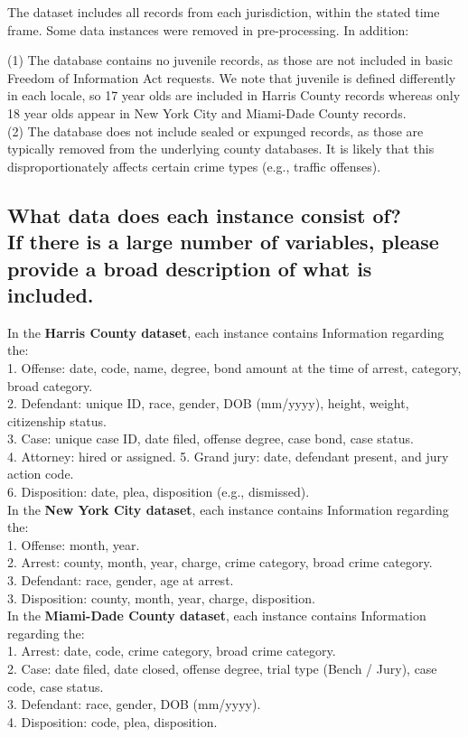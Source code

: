 \documentclass[letterpaper, 10 pt, conference]{ieeeconf}  %
\newcommand{\subtitle}[1]{{\\ \small \normalfont \color{purple} #1}}
\begin{document}
The dataset includes all records from each jurisdiction, within the stated time frame. Some data instances were removed in pre-processing. In addition: 

(1) The database contains no juvenile records, as those
are not included in basic Freedom of Information Act
requests. We note that juvenile is defined differently in
each locale, so 17 year olds are included in Harris
County records whereas only 18 year olds appear in
New York City and Miami-Dade County records. \\

(2) The database does not include sealed or expunged
records, as those are typically removed from the
underlying county databases. It is likely that this
disproportionately affects certain crime types (e.g.,
traffic offenses).

\subsection{What data does each instance consist of? \subtitle{If there is a large number of variables, please provide a broad description of what is included.}}

In the \textbf{Harris County dataset}, each instance contains Information regarding the: \\
1. Offense: date, code, name, degree, bond amount at the time of arrest, category, broad category. \\
2. Defendant: unique ID, race, gender, DOB (mm/yyyy), height, weight, citizenship status. \\
3. Case: unique case ID, date filed, offense degree, case bond, case status. \\
4. Attorney: hired or assigned.
5. Grand jury: date, defendant present, and jury action code. \\
6. Disposition: date, plea, disposition (e.g., dismissed). \\


In the \textbf{New York City dataset}, each instance contains Information regarding the: \\
1. Offense: month, year. \\
2. Arrest: county, month, year, charge, crime category, broad crime category. \\
3. Defendant: race, gender, age at arrest. \\
3. Disposition: county, month, year, charge, disposition. \\

In the \textbf{Miami-Dade County dataset}, each instance contains Information regarding the: \\ 
1. Arrest: date, code, crime category, broad crime category. \\
2. Case: date filed, date closed, offense degree, trial type (Bench / Jury), case code, case status. \\
3. Defendant: race, gender, DOB (mm/yyyy). \\
4. Disposition: code, plea, disposition. 
\end{document}
